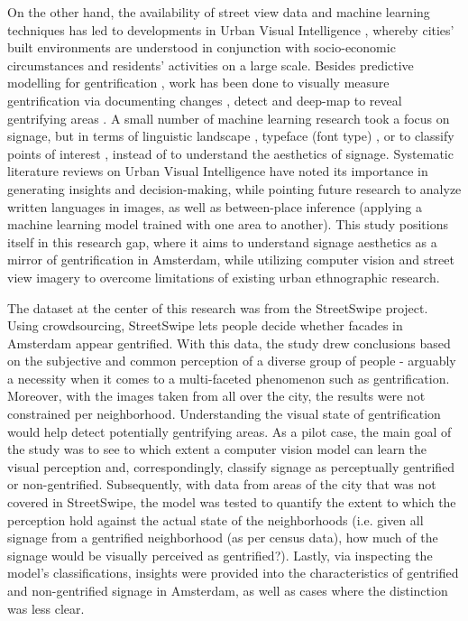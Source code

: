 On the other hand, the availability of street view data and machine learning techniques has led to developments in Urban Visual Intelligence \cite{zhanga_urban_2023}, whereby cities' built environments are understood in conjunction with socio-economic circumstances and residents' activities on a large scale. Besides predictive modelling for gentrification \cite{thackway_build_2021, reades_understanding_2019}, work has been done to visually measure gentrification via documenting changes \cite{ravuri_gsv_2022}, detect \cite{huang_detecting_2022} and deep-map to reveal gentrifying areas \cite{ilic_deepmap_2019}. A small number of machine learning research took a focus on signage, but in terms of linguistic landscape \cite{hong_linguistic_2020, thung_detecting_2022}, typeface (font type) \cite{ma_typef_2019}, or to classify points of interest \cite{noorian_detect_2020, bakaev_stsem_2019}, instead of to understand the aesthetics of signage. Systematic literature reviews on Urban Visual Intelligence \cite{biljecki_street_2021, zhanga_urban_2023} have noted its importance in generating insights and decision-making, while pointing future research to analyze written languages in images, as well as between-place inference (applying a machine learning model trained with one area to another). This study positions itself in this research gap, where it aims to understand signage aesthetics as a mirror of gentrification in Amsterdam, while utilizing computer vision and street view imagery to overcome limitations of existing urban ethnographic research.

The dataset at the center of this research was from the StreetSwipe project. Using crowdsourcing, StreetSwipe \cite{streetswipe} lets people decide whether facades in Amsterdam appear gentrified. With this data, the study drew conclusions based on the subjective and common perception of a diverse group of people - arguably a necessity when it comes to a multi-faceted phenomenon such as gentrification. Moreover, with the images taken from all over the city, the results were not constrained per neighborhood. Understanding the visual state of gentrification would help detect potentially gentrifying areas. As a pilot case, the main goal of the study was to see to which extent a computer vision model can learn the visual perception and, correspondingly, classify signage as perceptually gentrified or non-gentrified. Subsequently, with data from areas of the city that was not covered in StreetSwipe, the model was tested to quantify the extent to which the perception hold against the actual state of the neighborhoods (i.e. given all signage from a gentrified neighborhood (as per census data), how much of the signage would be visually perceived as gentrified?). Lastly, via inspecting the model's classifications, insights were provided into the characteristics of gentrified and non-gentrified signage in Amsterdam, as well as cases where the distinction was less clear.

